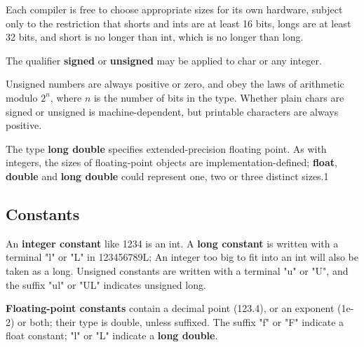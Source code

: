 \documentclass{article}
\begin{document}
Each compiler is free to choose appropriate sizes for its own hardware, subject only to the restriction that shorts and ints are at least 16 bits, longs are at least 32 bits, and short is no longer than int, which is no longer than long.

The qualifier \textbf{signed} or \textbf{unsigned} may be applied to char or any integer.

Unsigned numbers are always positive or zero, and obey the laws of arithmetic modulo $2^n$, where $n$ is the number of bits in the type. Whether plain chars are signed or unsigned is machine-dependent, but printable characters are always positive.

The type \textbf{long double} specifies extended-precision floating point. As with integers, the sizes of floating-point objects are implementation-defined; \textbf{float}, \textbf{double} and \textbf{long double} could represent one, two or three distinct sizes.1

\clearpage
\subsection{Constants}

An \textbf{integer constant} like 1234 is an int. 
A \textbf{long constant} is written with a terminal "l" or "L" in 123456789L; An integer too big to fit into an int will also be taken as a long. Unsigned constants are written with a terminal "u" or "U", and the suffix "ul" or "UL" indicates unsigned long.

\textbf{Floating-point constants} contain a decimal point (123.4), or an exponent (1e-2) or both; their type is double, unless suffixed. The suffix "f" or "F" indicate a float constant; "l" or "L" indicate a \textbf{long double}.
\end{document}
